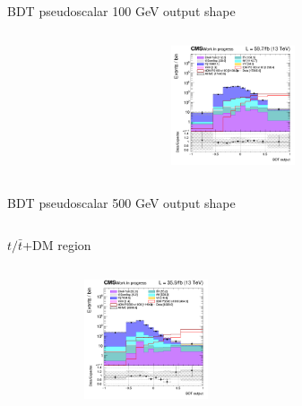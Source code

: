 \documentclass[8pt]{beamer}
\begin{document}
\begin{frame}{BDT pseudoscalar 100 GeV output shape}
\begin{columns}
\begin{column}{0.33\textwidth}
\begin{center}
     			\includegraphics[width=1.0\textwidth, height=100pt]{figs/2018/SmearSR-ttDM-pseudo100/log_cratio_topCR_ll_TTbar_BDT_output_pseudoscalar100_customBinsAttempt7.png}
    		\end{center}		
		\end{column}
\end{columns} \vfill
\end{frame}

\begin{frame}{BDT pseudoscalar 500 GeV output shape}
\begin{columns}
\begin{column}{1.09\textwidth}
\begin{block}{\centering $t/\bar t$+DM region}\end{block} \vspace{10pt}
\end{column}
\end{columns} \vspace{-24pt}
\begin{columns}
		\begin{column}{0.33\textwidth}
			\begin{center}
			\begin{block}{}\end{block}	
     			\includegraphics[width=1.0\textwidth, height=100pt]{figs/2016/SmearSR-ttDM-pseudo500/log_cratio_topCR_ll_ST_BDT_output_pseudoscalar500_customBinsAttempt7.png}
    		\end{center}		
		\end{column} 
		\begin{column}{0.33\textwidth}
			\begin{center}
			\begin{block}{}\end{block}	

\end{center}
\end{column}
\end{columns}
\end{frame}
\end{document}
